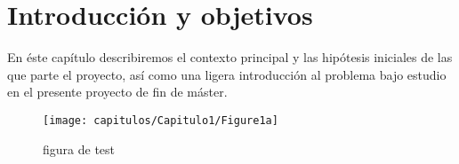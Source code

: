 \section{Introducción y objetivos}

En éste capítulo describiremos el contexto principal y las hipótesis iniciales de las que parte el proyecto, así como una ligera introducción al problema bajo estudio en el presente proyecto de fin de máster.

\begin{figure}
	\centering
	\texttt{[image: capitulos/Capitulo1/Figure1a]}
	\caption{ figura de test}
	\label{fig:figure1a}
\end{figure}
